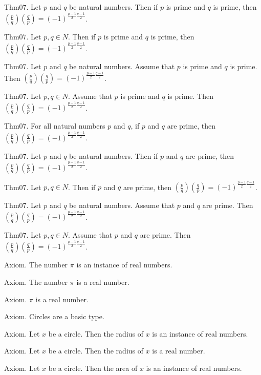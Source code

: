\documentclass{article}
\begin{document}
Thm07. Let $p$ and $q$ be natural numbers. Then if $p$ is prime and $q$ is prime, then $\left(\frac{ p }{ q }\right) \left(\frac{ q }{ p }\right) = (- 1)^ {\frac{ p - 1}{2}\frac{ q - 1}{2}}$.

Thm07. Let $p , q \in N$. Then if $p$ is prime and $q$ is prime, then $\left(\frac{ p }{ q }\right) \left(\frac{ q }{ p }\right) = (- 1)^ {\frac{ p - 1}{2}\frac{ q - 1}{2}}$.

Thm07. Let $p$ and $q$ be natural numbers. Assume that $p$ is prime and $q$ is prime. Then $\left(\frac{ p }{ q }\right) \left(\frac{ q }{ p }\right) = (- 1)^ {\frac{ p - 1}{2}\frac{ q - 1}{2}}$.

Thm07. Let $p , q \in N$. Assume that $p$ is prime and $q$ is prime. Then $\left(\frac{ p }{ q }\right) \left(\frac{ q }{ p }\right) = (- 1)^ {\frac{ p - 1}{2}\frac{ q - 1}{2}}$.

Thm07. For all natural numbers $p$ and $q$, if $p$ and $q$ are prime, then $\left(\frac{ p }{ q }\right) \left(\frac{ q }{ p }\right) = (- 1)^ {\frac{ p - 1}{2}\frac{ q - 1}{2}}$.

Thm07. Let $p$ and $q$ be natural numbers. Then if $p$ and $q$ are prime, then $\left(\frac{ p }{ q }\right) \left(\frac{ q }{ p }\right) = (- 1)^ {\frac{ p - 1}{2}\frac{ q - 1}{2}}$.

Thm07. Let $p , q \in N$. Then if $p$ and $q$ are prime, then $\left(\frac{ p }{ q }\right) \left(\frac{ q }{ p }\right) = (- 1)^ {\frac{ p - 1}{2}\frac{ q - 1}{2}}$.

Thm07. Let $p$ and $q$ be natural numbers. Assume that $p$ and $q$ are prime. Then $\left(\frac{ p }{ q }\right) \left(\frac{ q }{ p }\right) = (- 1)^ {\frac{ p - 1}{2}\frac{ q - 1}{2}}$.

Thm07. Let $p , q \in N$. Assume that $p$ and $q$ are prime. Then $\left(\frac{ p }{ q }\right) \left(\frac{ q }{ p }\right) = (- 1)^ {\frac{ p - 1}{2}\frac{ q - 1}{2}}$.

Axiom. The number \(\pi\) is an instance of real numbers.

Axiom. The number \(\pi\) is a real number.

Axiom. $\pi$ is a real number.

Axiom. Circles are a basic type.

Axiom. Let $x$ be a circle. Then the radius of $x$ is an instance of real numbers.

Axiom. Let $x$ be a circle. Then the radius of $x$ is a real number.

Axiom. Let $x$ be a circle. Then the area of $x$ is an instance of real numbers.
\end{document}
